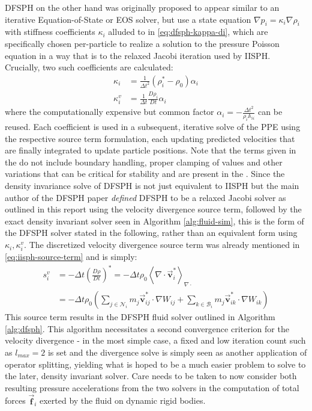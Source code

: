 \documentclass[oneside, a4paper]{book}
\newcommand\angled[1]{\left\langle#1\right\rangle}
\newcommand\vek[1]{\vec{\bm{#1}}}
\newcommand\mat[1]{{\mathds{#1}}}
\newcommand\br[1]{\left(#1\right)}
\newcommand\divergence{{\nabla\cdot}}
\begin{document}
    DFSPH on the other hand was originally proposed to appear similar to an iterative Equation-of-State or EOS solver, but use a state equation $\nabla p_i = \kappa_i\nabla \rho_i$ \autocite{dfsph} with stiffness coefficients $\kappa_i$ alluded to in \autoref{eq:dfsph-kappa-di}, which are specifically chosen per-particle to realize a solution to the pressure Poisson equation in a way that is \autocite[essentially equivalent]{2022-survey-equographics-star} to the relaxed Jacobi iteration used by IISPH. Crucially, two such coefficients are calculated:
    \begin{align}
      \kappa_i &= \frac{1}{\Delta t^2}\br{\rho_i^* - \rho_0}\alpha_i \\
      \kappa_i^v &= \frac{1}{\Delta t}\frac{D \rho_i}{D t}\alpha_i
    \end{align}
    where the computationally expensive but common factor $\alpha_i = -\frac{\Delta t^2}{\rho_i\mat{A}_{ii}}$ can be reused. Each coefficient is used in a subsequent, iterative solve of the PPE using the respective source term formulation, each updating predicted velocities that are finally integrated to update particle positions. Note that the terms given in the \autocite[DFSPH paper]{dfsph} do not include boundary handling, proper clamping of values and other variations that can be critical for stability and are present in the \autocite[authors' own implementation]{SPlisHSPlasH_Library}. Since the density invariance solve of DFSPH is not just equivalent to IISPH but the main author of the DFSPH paper\autocite{dfsph} \autocite[in a later paper]{consistent-boundaries} \textit{defined} DFSPH to be a relaxed Jacobi solver as outlined in this report using the velocity divergence source term, followed by the exact density invariant solver seen in Algorithm \ref{alg:fluid-sim}, this is the form of the DFSPH solver stated in the following, rather than an equivalent form using $\kappa_i, \kappa_i^v$. The discretized velocity divergence source term was already mentioned in \autoref{eq:iisph-source-term} and is simply:
    \begin{align}\label{eq:velocity-divergence-source-term}
      s_i^v &= - \Delta t \br{\frac{D\rho}{D t}}^* =- \Delta t  \rho_0 \angled{\divergence\vek{v}^*_i}_{\divergence} \\
      &= -\Delta t \rho_0  \br{
        \sum_{j\in\mathcal{N}_i} m_j\vek{v}_{ij}^*\cdot \nabla W_{ij}
        + \sum_{k\in\mathcal{B}_i} m_j\vek{v}_{ik}^*\cdot \nabla W_{ik}
      }
    \end{align}
    This source term results in the DFSPH fluid solver outlined in Algorithm \ref{alg:dfsph}. This algorithm necessitates a second convergence criterion for the velocity divergence - in the most simple case, a fixed and low iteration count such as $l_{max} = 2$ is set and the divergence solve is simply seen as another application of operator splitting, yielding what is hoped to be a much easier problem to solve to the later, density invariant solver. Care needs to be taken to now consider both resulting pressure accelerations from the two solvers in the computation of total forces $\vek{f}_i$ exerted by the fluid on dynamic rigid bodies. 
    
\end{document}
